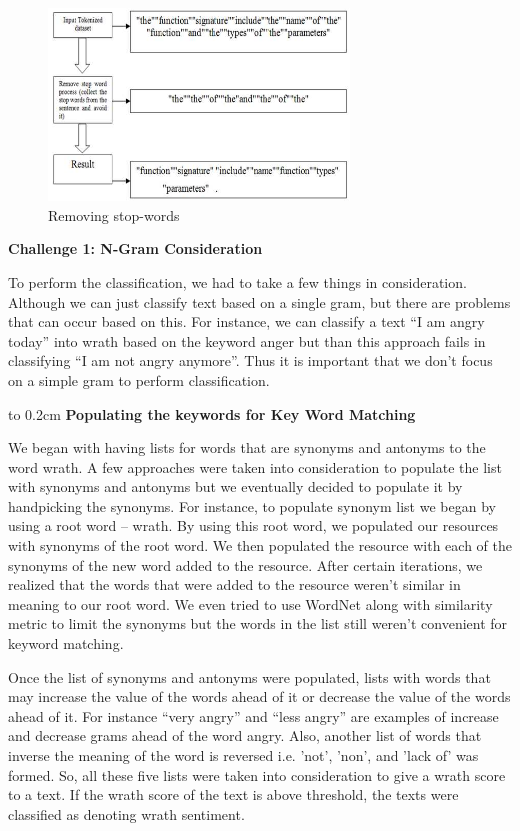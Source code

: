 \begin{figure}[H]
    \centering
    \includegraphics[width=8cm,keepaspectratio=true]{images/deployment/stop_words.png}
    \caption{Removing stop-words}
    \label{fig:stop-words-removal}
\end{figure}


{\bf Challenge 1: N-Gram Consideration}

To perform the classification, we had to take a few things in consideration. Although we can just classify text based on a single gram, but there are problems that can occur based on this. For instance, we can classify a text “I am angry today” into wrath based on the keyword anger but than this approach fails in classifying “I am not angry anymore”. Thus it is important that we don’t focus on a simple gram to perform classification. 

\vbox to 0.2cm{}
{\bf Populating the keywords for Key Word Matching}

We began with having lists for words that are synonyms and antonyms to the word wrath. A few approaches were taken into consideration to populate the list with synonyms and antonyms but we eventually decided to populate it by handpicking the synonyms. For instance, to populate synonym list we began by using a root word – wrath. By using this root word, we populated our resources with synonyms of the root word. We then populated the resource with each of the synonyms of the new word added to the resource. After certain iterations, we realized that the words that were added to the resource weren’t similar in meaning to our root word. We even tried to use WordNet along with similarity metric to limit the synonyms but the words in the list still weren’t convenient for keyword matching. 

Once the list of synonyms and antonyms were populated, lists with words that may increase the value of the words ahead of it or decrease the value of the words ahead of it. For instance “very angry” and “less angry” are examples of increase and decrease grams ahead of the word angry. Also, another list of words that inverse the meaning of the word is reversed i.e. 'not', 'non', and 'lack of' was formed. So, all these five lists were taken into consideration to give a wrath score to a text. If the wrath score of the text is above threshold, the texts were classified as denoting wrath sentiment. 


 
